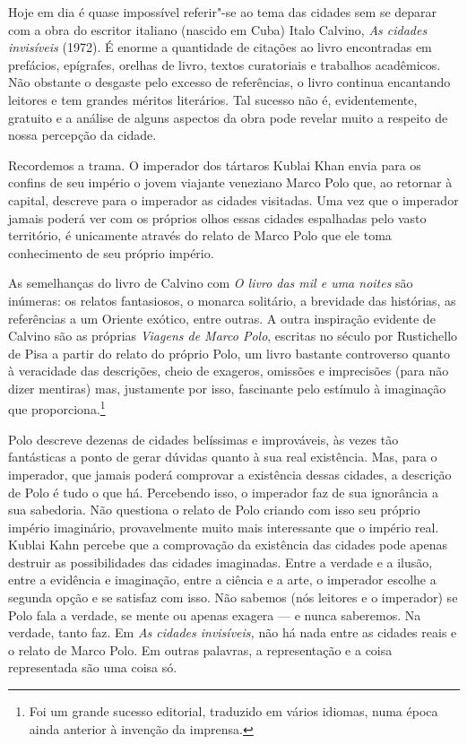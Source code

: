 Hoje em dia é quase impossível referir"-se ao tema das cidades sem se
deparar com a obra do escritor italiano (nascido em Cuba) Italo Calvino,
\emph{As cidades invisíveis} (1972). É enorme a quantidade de citações
ao livro encontradas em prefácios, epígrafes, orelhas de livro, textos
curatoriais e trabalhos acadêmicos. Não obstante o desgaste pelo excesso
de referências, o livro continua encantando leitores e tem grandes
méritos literários. Tal sucesso não é, evidentemente, gratuito e a
análise de alguns aspectos da obra pode revelar muito a respeito de
nossa percepção da cidade.

Recordemos a trama. O imperador dos tártaros Kublai Khan envia para os
confins de seu império o jovem viajante veneziano Marco Polo que, ao
retornar à capital, descreve para o imperador as cidades visitadas. Uma
vez que o imperador jamais poderá ver com os próprios olhos essas
cidades espalhadas pelo vasto território, é unicamente através do relato
de Marco Polo que ele toma conhecimento de seu próprio império.

As semelhanças do livro de Calvino com \emph{O livro das mil e uma
noites} são inúmeras: os relatos fantasiosos, o monarca solitário, a
brevidade das histórias, as referências a um Oriente exótico, entre
outras. A outra inspiração evidente de Calvino são as próprias
\emph{Viagens de Marco Polo}, escritas no século  por Rustichello de
Pisa a partir do relato do próprio Polo, um livro bastante controverso
quanto à veracidade das descrições, cheio de exageros, omissões e
imprecisões (para não dizer mentiras) mas, justamente por isso,
fascinante pelo estímulo à imaginação que proporciona.\footnote{Foi um
  grande sucesso editorial, traduzido em vários idiomas, numa época
  ainda anterior à invenção da imprensa.}

Polo descreve dezenas de cidades belíssimas e improváveis, às vezes tão
fantásticas a ponto de gerar dúvidas quanto à sua real existência. Mas,
para o imperador, que jamais poderá comprovar a existência dessas
cidades, a descrição de Polo é tudo o que há. Percebendo isso, o
imperador faz de sua ignorância a sua sabedoria. Não questiona o relato
de Polo criando com isso seu próprio império imaginário, provavelmente
muito mais interessante que o império real. Kublai Kahn percebe que a
comprovação da existência das cidades pode apenas destruir as
possibilidades das cidades imaginadas. Entre a verdade e a ilusão, entre
a evidência e imaginação, entre a ciência e a arte, o imperador escolhe
a segunda opção e se satisfaz com isso. Não sabemos (nós leitores e o
imperador) se Polo fala a verdade, se mente ou apenas exagera --- e nunca
saberemos. Na verdade, tanto faz. Em \emph{As cidades invisíveis,} não
há nada entre as cidades reais e o relato de Marco Polo. Em outras
palavras, a representação e a coisa representada são uma coisa só.

